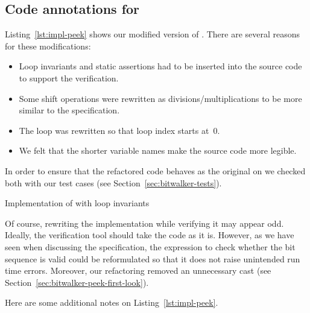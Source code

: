 \clearpage

\subsection{Code annotations for \peek}
\label{sec:peek-loop-invariants}

Listing~\ref{lst:impl-peek} shows our modified version of \peek.
There are several reasons for these modifications:

\begin{itemize}
\item Loop invariants and static assertions had to be inserted into
      the source code to support the verification.
\item Some shift operations were rewritten as divisions\slash multiplications
      to be more similar to the specification.
\item The loop was rewritten so that loop index starts at~0.
\item We felt that the shorter variable names make the source code more legible.
\end{itemize}

In order to ensure that the refactored code behaves as the original
on we checked both with our test cases (see Section~\ref{sec:bitwalker-tests}).

\begin{listing}[hbt]
\begin{minipage}{\textwidth}

\end{minipage}
\caption{\label{lst:impl-peek} Implementation of \peek with \acsl loop invariants}
\end{listing}

\clearpage

Of course, rewriting the implementation while verifying it may appear odd.
Ideally, the verification tool should take the code as it is.
However, as we have seen when discussing the specification, the
expression to check whether the bit sequence is valid
could be reformulated so that it does not raise unintended run time errors.
Moreover, our refactoring removed an unnecessary cast (see 
Section~\ref{sec:bitwalker-peek-first-look}).

Here are some additional notes on Listing~\ref{lst:impl-peek}.

